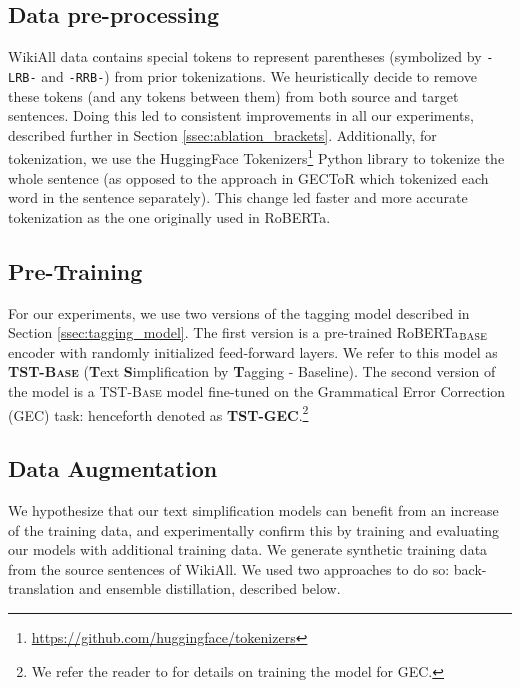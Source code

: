 \documentclass[11pt,a4paper]{article}
\begin{document}
\subsection{Data pre-processing}
\label{ssec:data_preproc}
WikiAll data contains special tokens to represent parentheses (symbolized by \texttt{-LRB-} and \texttt{-RRB-}) from prior tokenizations. We heuristically decide to remove these tokens (and any tokens between them) from both source and target sentences. Doing this led to consistent improvements in all our experiments, described further in Section \ref{ssec:ablation_brackets}.
Additionally, for tokenization, we use the HuggingFace Tokenizers\footnote{\url{https://github.com/huggingface/tokenizers}} Python library to tokenize the whole sentence (as opposed to the approach in GECToR which tokenized each word in the sentence separately). This change led faster and more accurate tokenization as the one originally used in RoBERTa. 









    


    
    


\subsection{Pre-Training}
\label{ssec:pre-training}
For our experiments, we use two versions of the tagging model described in Section \ref{ssec:tagging_model}. The first version is a pre-trained RoBERTa$_{\textsc{BASE}}$ encoder with randomly initialized feed-forward layers. We refer to this model as \textbf{\textsc{TST-Base}} (\textbf{T}ext \textbf{S}implification by \textbf{T}agging - Baseline). The second version of the model is a \textsc{TST-Base} model fine-tuned on the  Grammatical Error Correction (GEC) task: henceforth denoted as \textbf{\textsc{TST-GEC}}.\footnote{We refer the reader to \citet{omelianchuk-etal-2020-gector} for details on training the model for GEC.}



\subsection{Data Augmentation}
We hypothesize that our text simplification models can benefit from an increase of the training data, and experimentally confirm this by training and evaluating our models with additional training data. We generate synthetic training data from the source sentences of WikiAll. We used two approaches to do so: back-translation and ensemble distillation, described below.
\end{document}
